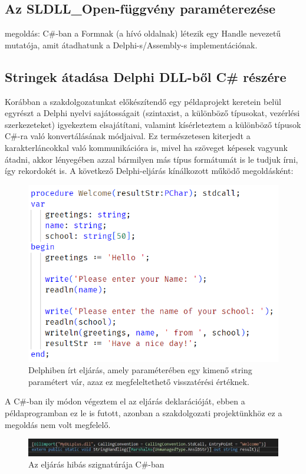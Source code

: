 \documentclass[tocnopagenum]{thesis-ekf}
\theoremstyle{definition}
\theoremstyle{remark}
\begin{document}
	\subsection{Az SLDLL\_Open-függvény paraméterezése}
	megoldás: C\#-ban a Formnak (a hívó oldalnak) létezik egy Handle nevezetű mutatója, amit átadhatunk a Delphi-s/Assembly-s implementációnak.
	\subsection{Stringek átadása Delphi DLL-ből C\# részére}
	Korábban a szakdolgozatunkat előkészítendő egy példaprojekt keretein belül egyrészt a Delphi nyelvi sajátosságait (szintaxist, a különböző típusokat, vezérlési szerkezeteket) igyekeztem elsajátítani, valamint kísérleteztem a különböző típusok C\#-ra való konvertálásának módjaival. Ez természetesen kiterjedt a karakterláncokkal való kommunikációra is, mivel ha szöveget képesek vagyunk átadni, akkor lényegében azzal bármilyen más típus formátumát is le tudjuk írni, így rekordokét is.
	A következő Delphi-eljárás kínálkozott működő megoldásként:
	\begin{figure}[h!]
		\centering
		\includegraphics[scale=0.9]{hibas_string_delphi}
		\caption{Delphiben írt eljárás, amely paraméterében egy kimenő string paramétert vár, azaz ez megfeleltethető visszatérési értéknek.}
		\label{hibas_string_delphi}
	\end{figure}
	A C\#-ban ily módon végeztem el az eljárás deklarációját, ebben a példaprogramban ez le is futott, azonban a szakdolgozati projektünkhöz ez a megoldás nem volt megfelelő.
	\begin{figure}[h!]
		\includegraphics[scale=0.7]{hibas_string_csharp}
		\caption{Az eljárás hibás szignatúrája C\#-ban}
		\label{hibas_string_csharp}
	\end{figure}
\end{document}

